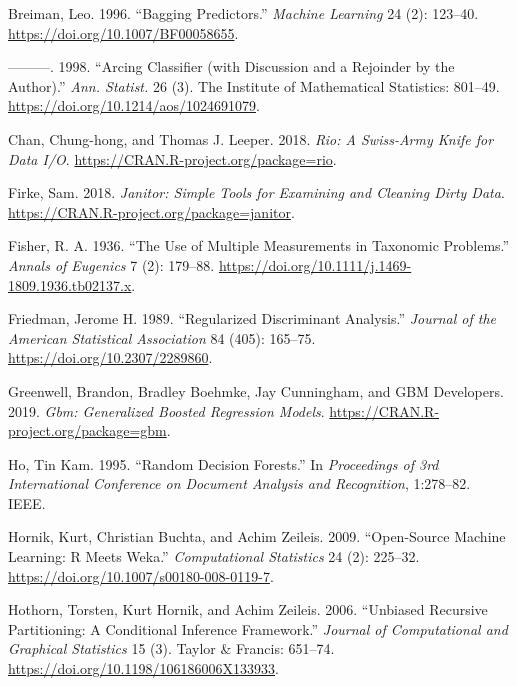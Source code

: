 \documentclass[]{book}
\theoremstyle{plain}
\theoremstyle{definition}
\theoremstyle{definition}
\theoremstyle{definition}
\theoremstyle{definition}
\theoremstyle{remark}
\begin{document}
\leavevmode\hypertarget{ref-breiman1996}{}%
Breiman, Leo. 1996. ``Bagging Predictors.'' \emph{Machine Learning} 24 (2): 123--40. \url{https://doi.org/10.1007/BF00058655}.

\leavevmode\hypertarget{ref-breiman1998}{}%
---------. 1998. ``Arcing Classifier (with Discussion and a Rejoinder by the Author).'' \emph{Ann. Statist.} 26 (3). The Institute of Mathematical Statistics: 801--49. \url{https://doi.org/10.1214/aos/1024691079}.

\leavevmode\hypertarget{ref-R-rio}{}%
Chan, Chung-hong, and Thomas J. Leeper. 2018. \emph{Rio: A Swiss-Army Knife for Data I/O}. \url{https://CRAN.R-project.org/package=rio}.

\leavevmode\hypertarget{ref-R-janitor}{}%
Firke, Sam. 2018. \emph{Janitor: Simple Tools for Examining and Cleaning Dirty Data}. \url{https://CRAN.R-project.org/package=janitor}.

\leavevmode\hypertarget{ref-fisher1936}{}%
Fisher, R. A. 1936. ``The Use of Multiple Measurements in Taxonomic Problems.'' \emph{Annals of Eugenics} 7 (2): 179--88. \url{https://doi.org/10.1111/j.1469-1809.1936.tb02137.x}.

\leavevmode\hypertarget{ref-friedman1989}{}%
Friedman, Jerome H. 1989. ``Regularized Discriminant Analysis.'' \emph{Journal of the American Statistical Association} 84 (405): 165--75. \url{https://doi.org/10.2307/2289860}.

\leavevmode\hypertarget{ref-R-gbm}{}%
Greenwell, Brandon, Bradley Boehmke, Jay Cunningham, and GBM Developers. 2019. \emph{Gbm: Generalized Boosted Regression Models}. \url{https://CRAN.R-project.org/package=gbm}.

\leavevmode\hypertarget{ref-ho1995}{}%
Ho, Tin Kam. 1995. ``Random Decision Forests.'' In \emph{Proceedings of 3rd International Conference on Document Analysis and Recognition}, 1:278--82. IEEE.

\leavevmode\hypertarget{ref-R-Rweka}{}%
Hornik, Kurt, Christian Buchta, and Achim Zeileis. 2009. ``Open-Source Machine Learning: R Meets Weka.'' \emph{Computational Statistics} 24 (2): 225--32. \url{https://doi.org/10.1007/s00180-008-0119-7}.

\leavevmode\hypertarget{ref-R-party}{}%
Hothorn, Torsten, Kurt Hornik, and Achim Zeileis. 2006. ``Unbiased Recursive Partitioning: A Conditional Inference Framework.'' \emph{Journal of Computational and Graphical Statistics} 15 (3). Taylor \& Francis: 651--74. \url{https://doi.org/10.1198/106186006X133933}.
\end{document}
